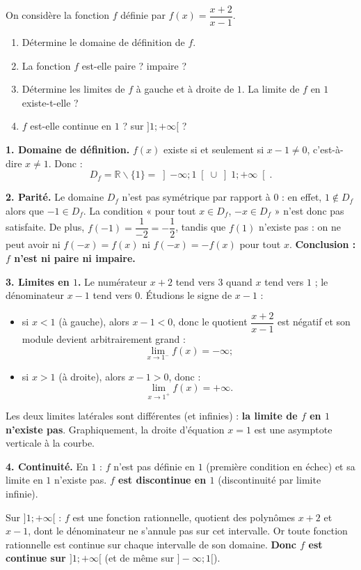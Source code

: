 \documentclass[11pt]{article}
\def\setminus{\mathbin{\backslash}}\let\smallsetminus\setminus
\begin{document}
\begin{exoresolu}[Étude complète de $f(x) = \dfrac{x+2}{x-1}$ en $1$]
On considère la fonction $f$ définie par $f(x) = \dfrac{x+2}{x-1}$.
\begin{enumerate}
\item Détermine le domaine de définition de $f$.
\item La fonction $f$ est-elle paire ? impaire ?
\item Détermine les limites de $f$ à gauche et à droite de $1$. La limite de $f$ en $1$ existe-t-elle ?
\item $f$ est-elle continue en $1$ ? sur $]1 ; +\infty[$ ?
\end{enumerate}
\tcblower
\textbf{1. Domaine de définition.} $f(x)$ existe si et seulement si $x - 1 \neq 0$, c'est-à-dire $x \neq 1$. Donc :
\[ D_f = \mathbb{R} \setminus \{1\} = \left]-\infty ; 1\right[ \cup \left]1 ; +\infty\right[. \]

\textbf{2. Parité.} Le domaine $D_f$ n'est pas symétrique par rapport à $0$ : en effet, $1 \notin D_f$ alors que $-1 \in D_f$. La condition « pour tout $x \in D_f$, $-x \in D_f$ » n'est donc pas satisfaite. De plus, $f(-1) = \dfrac{1}{-2} = -\dfrac{1}{2}$, tandis que $f(1)$ n'existe pas : on ne peut avoir ni $f(-x) = f(x)$ ni $f(-x) = -f(x)$ pour tout $x$. \textbf{Conclusion : $f$ n'est ni paire ni impaire.}

\textbf{3. Limites en $1$.} Le numérateur $x + 2$ tend vers $3$ quand $x$ tend vers $1$ ; le dénominateur $x - 1$ tend vers $0$. Étudions le signe de $x - 1$ :
\begin{itemize}
\item si $x < 1$ (à gauche), alors $x - 1 < 0$, donc le quotient $\dfrac{x+2}{x-1}$ est négatif et son module devient arbitrairement grand :
\[ \lim_{x \to 1^-} f(x) = -\infty ; \]
\item si $x > 1$ (à droite), alors $x - 1 > 0$, donc :
\[ \lim_{x \to 1^+} f(x) = +\infty. \]
\end{itemize}
Les deux limites latérales sont différentes (et infinies) : \textbf{la limite de $f$ en $1$ n'existe pas}. Graphiquement, la droite d'équation $x = 1$ est une asymptote verticale à la courbe.

\textbf{4. Continuité.} En $1$ : $f$ n'est pas définie en $1$ (première condition en échec) et sa limite en $1$ n'existe pas. \textbf{$f$ est discontinue en $1$} (discontinuité par limite infinie).

Sur $]1 ; +\infty[$ : $f$ est une fonction rationnelle, quotient des polynômes $x + 2$ et $x - 1$, dont le dénominateur ne s'annule pas sur cet intervalle. Or toute fonction rationnelle est continue sur chaque intervalle de son domaine. \textbf{Donc $f$ est continue sur $]1 ; +\infty[$} (et de même sur $]-\infty ; 1[$).
\end{exoresolu}
\end{document}
